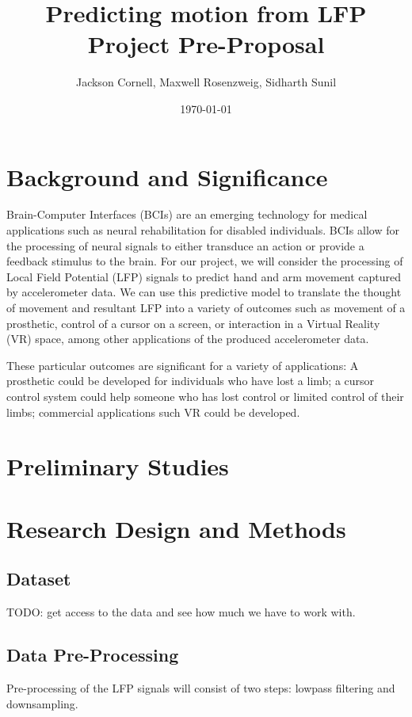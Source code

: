 \documentclass[12pt]{article}
\title{ Predicting motion from LFP Project Pre-Proposal }
\author{ Jackson Cornell, Maxwell Rosenzweig, Sidharth Sunil }
\date{\today}
\begin{document}
\maketitle

\section{Background and Significance}

Brain-Computer Interfaces (BCIs) are an emerging technology for medical applications such as neural rehabilitation for disabled individuals. BCIs allow for the processing of neural signals to either transduce an action or provide a feedback stimulus to the brain. For our project, we will consider the processing of Local Field Potential (LFP) signals to predict hand and arm movement captured by accelerometer data. We can use this predictive model to translate the thought of movement and resultant LFP into a variety of outcomes such as movement of a prosthetic, control of a cursor on a screen, or interaction in a Virtual Reality (VR) space, among other applications of the produced accelerometer data.

These particular outcomes are significant for a variety of applications: A prosthetic could be developed for individuals who have lost a limb; a cursor control system could help someone who has lost control or limited control of their limbs; commercial applications such VR could be developed.

\section{Preliminary Studies}

\section{Research Design and Methods}

\subsection{Dataset}

TODO: get access to the data and see how much we have to work with.

\subsection{Data Pre-Processing}

Pre-processing of the LFP signals will consist of two steps: lowpass filtering and downsampling. 
\end{document}
